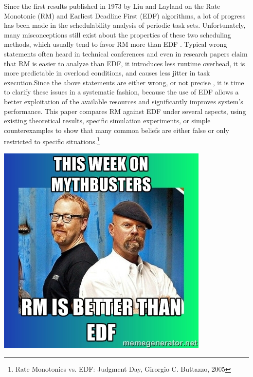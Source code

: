 \begin{frame}{\subsecname}
\tiny Since the first results published in 1973 by Liu and Layland on the Rate Monotonic (RM) and Earliest Deadline First (EDF) algorithms, a lot of progress has been made in the schedulability analysis of periodic task sets. Unfortunately, many \Large misconceptions \tiny still exist about the properties of these two scheduling methods, which usually tend to \Large favor RM more than EDF \tiny. Typical wrong statements often heard in technical conferences and even in research papers claim that RM is easier to analyze than EDF, it introduces less runtime overhead, it is more predictable in overload conditions, and causes less jitter in task execution.Since the above statements are \Large  either wrong, or not precise \tiny, it is time to clarify these issues in a systematic fashion, because the use of EDF allows a better exploitation of the available resources and significantly improves system’s performance. \Large This paper compares RM against EDF \tiny under several aspects, using existing theoretical results, specific simulation experiments, or simple counterexamples to show that many common beliefs are either false or only restricted to specific situations.\footnote{Rate Monotonics vs. EDF: Judgment Day, Girorgio C. Buttazzo, 2005}
\end{frame}


\begin{frame}{\subsecname}
	\begin{center}
		\includegraphics[scale=0.6]{graphics/memes/mythbusters_thisweek.jpg}
	\end{center}
\end{frame}

